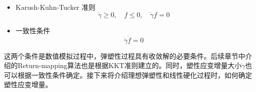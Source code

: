 \begin{itemize}
    \item Karush-Kuhn-Tucker 准则
\begin{equation}
\dot \gamma \ge 0,\quad f \le 0, \quad \dot \gamma f = 0
\end{equation}
    \item 一致性条件
\begin{equation}
\dot \gamma \dot f = 0
\end{equation}
\end{itemize}\par
这两个条件是数值模拟过程中，弹塑性过程具有收敛解的必要条件。后续章节中介绍的Return-mapping算法也是根据KKT准则建立的。同时，塑性应变增量大小$\dot \gamma$也可以根据一致性条件确定。接下来将介绍理想弹塑性和线性硬化过程时，如何确定塑性应变增量。

